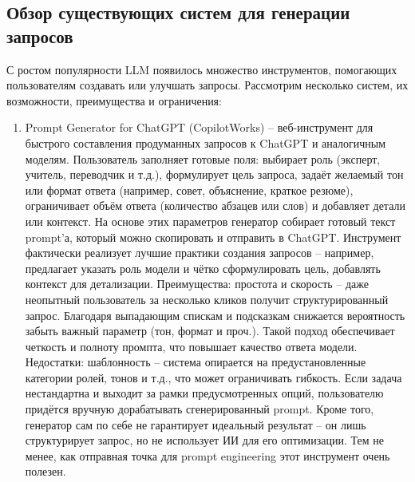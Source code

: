 \subsection{Обзор существующих систем для генерации запросов} С ростом популярности LLM появилось множество инструментов, помогающих пользователям создавать или улучшать запросы. Рассмотрим несколько систем, их возможности, преимущества и ограничения:
\begin{enumerate}[label=\arabic*.]
\item Prompt Generator for ChatGPT (CopilotWorks) – веб-инструмент для быстрого составления продуманных запросов к ChatGPT и аналогичным моделям. Пользователь заполняет готовые поля: выбирает роль (эксперт, учитель, переводчик и т.д.), формулирует цель запроса, задаёт желаемый тон или формат ответа (например, совет, объяснение, краткое резюме), ограничивает объём ответа (количество абзацев или слов) и добавляет детали или контекст\cite{copilotworks:promptgen}.  На основе этих параметров генератор собирает готовый текст prompt’а, который можно скопировать и отправить в ChatGPT\cite{copilotworks:promptgen}. Инструмент фактически реализует лучшие практики создания запросов – например, предлагает указать роль модели и чётко сформулировать цель, добавлять контекст для детализации\cite{copilotworks:promptgen}. Преимущества: простота и скорость – даже неопытный пользователь за несколько кликов получит структурированный запрос. Благодаря выпадающим спискам и подсказкам снижается вероятность забыть важный параметр (тон, формат и проч.). Такой подход обеспечивает четкость и полноту промпта, что повышает качество ответа модели. Недостатки: шаблонность – система опирается на предустановленные категории ролей, тонов и т.д., что может ограничивать гибкость. Если задача нестандартна и выходит за рамки предусмотренных опций, пользователю придётся вручную дорабатывать сгенерированный prompt. Кроме того, генератор сам по себе не гарантирует идеальный результат – он лишь структурирует запрос, но не использует ИИ для его оптимизации. Тем не менее, как отправная точка для prompt engineering этот инструмент очень полезен.


\end{enumerate}
